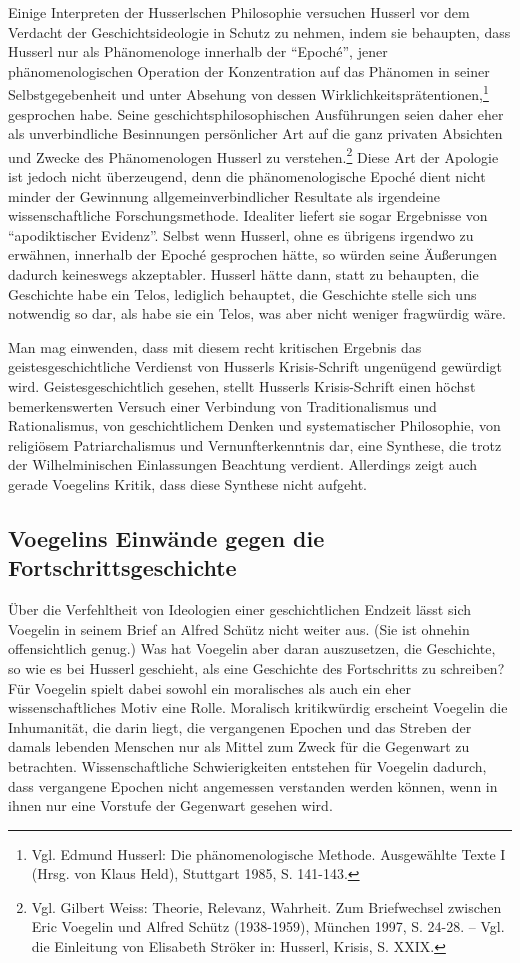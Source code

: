 Einige Interpreten der Husserlschen Philosophie versuchen Husserl vor dem
Verdacht der Geschichtsideologie in Schutz zu nehmen, indem sie behaupten,
dass Husserl nur als Phänomenologe innerhalb der "`Epoché"', jener
phänomenologischen Operation der Konzentration auf das Phänomen in seiner
Selbstgegebenheit und unter Absehung von dessen
Wirklichkeitsprätentionen,\footnote{Vgl. Edmund Husserl: Die phänomenologische
  Methode. Ausgewählte Texte I (Hrsg. von Klaus Held), Stuttgart 1985, S.
  141-143.} gesprochen habe. Seine geschichtsphilosophischen Ausführungen
seien daher eher als unverbindliche Besinnungen persönlicher Art auf die ganz
privaten Absichten und Zwecke des Phänomenologen Husserl zu
verstehen.\footnote{Vgl.  Gilbert Weiss: Theorie, Relevanz, Wahrheit. Zum
  Briefwechsel zwischen Eric Voegelin und Alfred Schütz (1938-1959), München
  1997, S. 24-28. -- Vgl. die Einleitung von Elisabeth Ströker in: Husserl,
  Krisis, S. XXIX.} Diese Art der Apologie ist jedoch nicht überzeugend, denn
die phänomenologische Epoché dient nicht minder der Gewinnung
allgemeinverbindlicher Resultate als irgendeine wissenschaftliche
Forschungsmethode. Idealiter liefert sie sogar Ergebnisse von "`apodiktischer
Evidenz"'. Selbst wenn Husserl, ohne es übrigens irgendwo zu erwähnen,
innerhalb der Epoché gesprochen hätte, so würden seine Äußerungen dadurch
keineswegs akzeptabler.  Husserl hätte dann, statt zu behaupten, die
Geschichte habe ein Telos, lediglich behauptet, die Geschichte stelle sich uns
notwendig so dar, als habe sie ein Telos, was aber nicht weniger fragwürdig
wäre.

Man mag einwenden, dass mit diesem recht kritischen Ergebnis das
geistesgeschichtliche Verdienst von Husserls Krisis-Schrift ungenügend
gewürdigt wird. Geistesgeschichtlich gesehen, stellt Husserls Krisis-Schrift
einen höchst bemerkenswerten Versuch einer Verbindung von Traditionalismus und
Rationalismus, von geschichtlichem Denken und systematischer Philosophie, von
religiösem Patriarchalismus und Vernunfterkenntnis dar, eine Synthese, die trotz
der Wilhelminischen Einlassungen Beachtung verdient. Allerdings zeigt
auch gerade Voegelins Kritik, dass diese Synthese nicht aufgeht.

\subsection{Voegelins Einwände gegen die Fortschrittsgeschichte}

Über die Verfehltheit von Ideologien einer geschichtlichen Endzeit lässt sich
Voegelin in seinem Brief an Alfred Schütz nicht weiter aus. (Sie ist ohnehin
offensichtlich genug.) Was hat Voegelin aber daran auszusetzen, die
Geschichte, so wie es bei Husserl geschieht, als eine Geschichte des
Fortschritts zu schreiben? Für Voegelin spielt dabei sowohl ein moralisches
als auch ein eher wissenschaftliches Motiv eine Rolle. Moralisch kritikwürdig
erscheint Voegelin die Inhumanität, die darin liegt, die vergangenen Epochen
und das Streben der damals lebenden Menschen nur als Mittel zum Zweck für die
Gegenwart zu betrachten. Wissenschaftliche Schwierigkeiten entstehen für
Voegelin dadurch, dass vergangene Epochen nicht angemessen verstanden werden
können, wenn in ihnen nur eine Vorstufe der Gegenwart gesehen wird.

